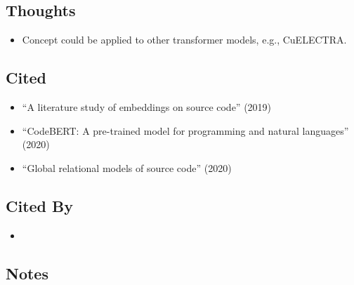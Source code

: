 \documentclass{article}
\begin{document}
\subsection*{Thoughts}
\begin{itemize}
\item Concept could be applied to other transformer models, e.g., CuELECTRA.
\end{itemize}

\subsection*{Cited}
\begin{itemize}
\item ``A literature study of embeddings on source code'' (2019)
\item ``CodeBERT: A pre-trained model for programming and natural languages'' (2020)
\item ``Global relational models of source code'' (2020)
\end{itemize}

\subsection*{Cited By}
\begin{itemize}
\item
\end{itemize}

\subsection*{Notes}
\end{document}
